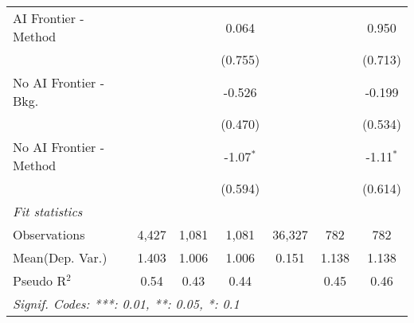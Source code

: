 \begin{tabular}{lcccccc}
   AI Frontier - Method    &               &              & 0.064        &        &         & 0.950\\   
                           &               &              & (0.755)      &        &         & (0.713)\\   
   No AI Frontier - Bkg.   &               &              & -0.526       &        &         & -0.199\\   
                           &               &              & (0.470)      &        &         & (0.534)\\   
   No AI Frontier - Method &               &              & -1.07$^{*}$  &        &         & -1.11$^{*}$\\   
                           &               &              & (0.594)      &        &         & (0.614)\\   
   \midrule
   \emph{Fit statistics}\\
   Observations            & 4,427         & 1,081        & 1,081        & 36,327 & 782     & 782\\  
Mean(Dep. Var.) & 1.403 & 1.006 & 1.006 & 0.151 & 1.138 & 1.138 \\
   Pseudo R$^2$            & 0.54          & 0.43         & 0.44         &        & 0.45    & 0.46\\  
   \midrule \midrule
   \multicolumn{7}{l}{\emph{Signif. Codes: ***: 0.01, **: 0.05, *: 0.1}}\\
\end{tabular}
\par\endgroup
